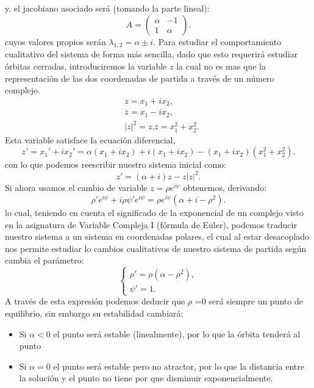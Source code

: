 \begin{enumerate}
	
	 y, el jacobiano asociado será (tomando la parte lineal): 	 
	 \[ A= \begin{pmatrix} \alpha & -1 \\ 1 & \alpha \end{pmatrix} .\]
	cuyos valores propios serán $\lambda_{1,2} = \alpha \pm i$.
	Para estudiar el comportamiento cualitativo del sistema de forma más sencilla, dado que esto requerirá estudiar órbitas cerradas, introduciremos la variable $z$ la cual no es mas que la representación de las dos coordenadas de partida a través de un número complejo.\\
	\begin{equation}
	\begin{split}
	&z = x_1+ix_2, \\&\overline{z} = x_1-ix_2, \\ &|z|^2=z.\overline{z} = x_1^2+x_2^2.
	\end{split} 
	\end{equation}
	Esta variable satisface la ecuación diferencial,
	\[ z' = x_1' + ix_2' = \alpha(x_1 + ix_2 ) + i(x_1 + ix_2 ) - (x_1 + ix_2 )(x_1^2 + x_2^2 ). \] 
	con lo que podemos reescribir nuestro sistema inicial como: 
	\begin{equation}
	z' = (\alpha+i)z-z|z|^2 .
	\end{equation}
	Si ahora usamos el cambio de variable $z=\rho e^{i\psi}$ obtenemos, derivando:
	\[ \rho' e^{i\psi}+ i\rho\psi' e^{i\psi} = \rho e^{i\psi}(\alpha+i-\rho^2). \]
	lo cual, teniendo en cuenta el significado de la exponencial de un complejo visto en la asignatura de Variable Compleja I (fórmula de Euler), podemos traducir nuestro sistema a un sistema en coordenadas polares, el cual al estar desacoplado nos permite estudiar lo cambios cualitativos de nuestro sistema de partida según cambia el parámetro: 
	\[ \left \{ \begin{matrix} \rho' = \rho(\alpha - \rho ^2 ),\\ \psi' =1. \end{matrix}\right. \]	
	A través de esta expresión podemos deducir que $\rho$ =0 será siempre un punto de equilibrio, sin embargo su estabilidad cambiará:
	\begin{itemize}
		\item Si $ \alpha<0 $ el punto será estable (linealmente), por lo que la órbita tenderá al punto
		\item Si $\alpha=0$ el punto será estable pero no atractor, por lo que la distancia entre la solución y el punto no tiene por que disminuir exponencialmente.

\end{itemize}
\end{enumerate}
